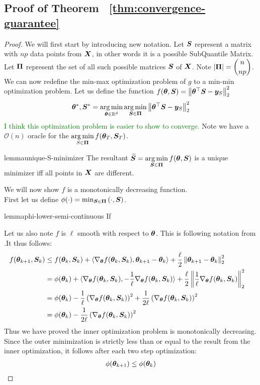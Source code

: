 \documentclass{article} %
\newcommand{\norm}[1]{\left\lVert#1\right\rVert}
\begin{document}
\begin{appendices}
	\subsection{Proof of Theorem ~\ref{thm:convergence-guarantee}}
	\begin{proof}
	We will first start by introducing new notation. Let ${\bm{S}}$ represent a matrix with $np$ data points from ${\bm{X}}$, in other words it is a possible SubQuantile Matrix. Let $\displaystyle{\bm{\Pi}}$ represent the set of all such possible matrices ${\bm{S}}$ of ${\bm{X}}$. Note $\displaystyle \left|{\bm{\Pi}}\right| = \binom{n}{np}$. We can now redefine the min-max optimization problem of $g$ to a min-min optimization problem. Let us define the function $f(\vtheta, \mS) = \norm{\vtheta^\top\mS - \vy_S}_2^2$
	\begin{equation}
		\vtheta^*, \mS^* = \argmin_{\vtheta \in \mathbb{R}^d} \argmin_{\mS \in \vPi} \norm{\vtheta^\top\mS - \vy_S}_2^2
	\end{equation}
	\textcolor{green}{I think this optimization problem is easier to show to converge.}
	Note we have a $\mathcal{O}(n)$ oracle for the $\displaystyle \operatorname*{arg\,min}_{S\in {\bm{\Pi}}}f({\bm{\theta}}_T,{\bm{S}}_T)$. 
	\begin{restatable}{lemma}{unique-S-minimizer}
		\label{lem:unique-S-minimizer}
		The resultant $\displaystyle \widetilde{{\bm{S}}} = \operatorname*{arg\,min}_{{\bm{S}} \in {\bm{\Pi}}} f({\bm{\theta}},{\bm{S}})$ is a unique minimizer iff all points in ${\bm{X}}$ are different. 
	\end{restatable}
	We will now show $f$ is a monotonically decreasing function.\\
	First let us define $\phi(\cdot) = \min_{{\bm{S}} \in {\bm{\Pi}}}\left(\cdot,{\bm{S}}\right)$.
	\begin{restatable}{lemma}{phi-lower-semi-continuous}
		If 
	\end{restatable}
	Let us also note $f$ is $\ell$ smooth with respect to ${\bm{\theta}}$. This is following notation from \cite{Jin_2019}.It thus follows:
	\begin{align*}
		f(\vtheta_{k+1}, \mS_k) &\leq f(\vtheta_k, \mS_k) + \langle\nabla_\vtheta f(\vtheta_k,\mS_k), \vtheta_{k+1}-\vtheta_k \rangle + \frac{\ell}{2}\norm{\vtheta_{k+1}-\vtheta_k}_2^2 &&\\
		&= \phi(\vtheta_k) + \langle\nabla_\vtheta f(\vtheta_k,\mS_k), -\frac{1}{\ell}\nabla_\vtheta f(\vtheta_k,\mS_k)\rangle + \frac{\ell}{2}\norm{\frac{1}{\ell}\nabla_\vtheta f(\vtheta_k,\mS_k)}_2^2 &&\\
		&= \phi(\vtheta_k) - \frac{1}{\ell}\left(\nabla_\vtheta f(\vtheta_k,\mS_k)\right)^2 + \frac{1}{2\ell}\left(\nabla_\vtheta f(\vtheta_k,\mS_k)\right)^2 &&\\
		&= \phi(\vtheta_k) - \frac{1}{2\ell}\left(\nabla_\vtheta f(\vtheta_k,\mS_k)\right)^2 &&\\
	\end{align*} 
	Thus we have proved the inner optimization problem is monotonically decreasing. Since the outer minimization is strictly less than or equal to the result from the inner optimization, it follows after each two step optimization: 
	\begin{align*}
		\phi({\bm{\theta}}_{k+1}) \leq \phi({\bm{\theta}}_k)
	\end{align*}
	

\end{proof}
\end{appendices}
\end{document}
